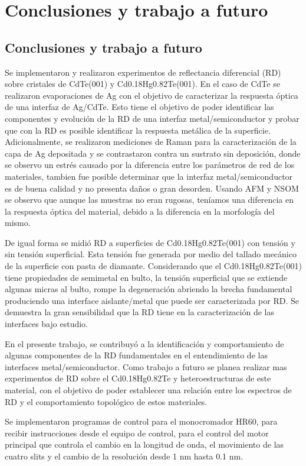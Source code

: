 \chapter{Conclusiones y trabajo a futuro}
\label{chap:conclusions}
\textit{}
\vfill
\minitoc
\newpage
\section{Conclusiones y trabajo a futuro}
\label{ch5:conlusions}
Se implementaron y realizaron experimentos de reflectancia diferencial (RD) sobre cristales de CdTe(001) y 
Cd0.18Hg0.82Te(001). En el caso de CdTe se realizaron evaporaciones de Ag con el objetivo de caracterizar la respuesta 
óptica de una interfaz de Ag/CdTe. Esto tiene el objetivo de poder identificar las componentes y evolución de la RD de 
una interfaz metal/semiconductor y probar que con la RD es posible identificar la respuesta metálica de la superficie.
Adicionalmente, se realizaron mediciones de Raman para la caracterización de la capa de Ag depositada y se contrastaron
contra un sustrato sin deposición, donde se observo un estrés causado por la diferencia entre los parámetros de red 
de los materiales, tambien fue posible determinar que la interfaz metal/semiconductor es de buena calidad y no presenta 
daños o gran desorden. Usando AFM y NSOM se observo que aunque las muestras no eran rugosas, teníamos una diferencia en
la respuesta óptica del material, debido a la diferencia en la morfología del mismo.

De igual forma se midió RD a superficies de Cd0.18Hg0.82Te(001) con tensión y sin tensión superficial. Esta tensión fue 
generada por medio del tallado mecánico de la superficie con pasta de diamante. Considerando que el Cd0.18Hg0.82Te(001) 
tiene propiedades de semimetal en bulto, la tensión superficial que se extiende algunas micras al bulto, rompe la 
degeneración abriendo la brecha fundamental produciendo una interface aislante/metal que puede ser caracterizada por RD. 
Se demuestra la gran sensibilidad que la RD tiene en la caracterización de las interfaces bajo estudio.

En el presente trabajo, se contribuyó a la identificación y comportamiento de algunas componentes de la RD 
fundamentales en el entendimiento de las interfaces metal/semiconductor. Como trabajo a futuro se planea realizar 
mas experimentos de RD sobre el Cd0.18Hg0.82Te y heteroestructuras de este material, con el objetivo de poder 
establecer una relación entre los espectros de RD y el comportamiento topológico de estos materiales.

Se implementaron programas de control para el monocromador HR60, para recibir instrucciones desde el equipo de control, 
para el control del motor principal que controla el cambio en la longitud de onda, el movimiento de las cuatro slits y 
el cambio de la resolución desde 1 nm hasta 0.1 nm.
